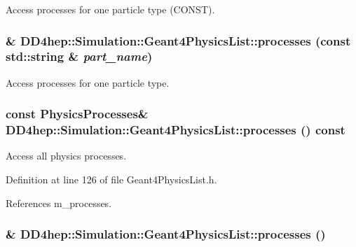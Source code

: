 Access processes for one particle type (CONST). \hypertarget{class_d_d4hep_1_1_simulation_1_1_geant4_physics_list_a5ab9bb1ab768d100453ab9fa528be067}{
\subsubsection[{processes}]{\& DD4hep::Simulation::Geant4PhysicsList::processes (const std::string \& {\em part\_\-name})}}
\label{class_d_d4hep_1_1_simulation_1_1_geant4_physics_list_a5ab9bb1ab768d100453ab9fa528be067}


Access processes for one particle type. \hypertarget{class_d_d4hep_1_1_simulation_1_1_geant4_physics_list_ae57b43dcb9dcc62d3fe83764a4956f5c}{
\subsubsection[{processes}]{\setlength{\rightskip}{0pt plus 5cm}const {\bf PhysicsProcesses}\& DD4hep::Simulation::Geant4PhysicsList::processes () const}}
\label{class_d_d4hep_1_1_simulation_1_1_geant4_physics_list_ae57b43dcb9dcc62d3fe83764a4956f5c}


Access all physics processes. 

Definition at line 126 of file Geant4PhysicsList.h.

References m\_\-processes.\hypertarget{class_d_d4hep_1_1_simulation_1_1_geant4_physics_list_abd2fd72a935c5a809d216026b503e154}{
\subsubsection[{processes}]{\& DD4hep::Simulation::Geant4PhysicsList::processes ()}}
\label{class_d_d4hep_1_1_simulation_1_1_geant4_physics_list_abd2fd72a935c5a809d216026b503e154}


